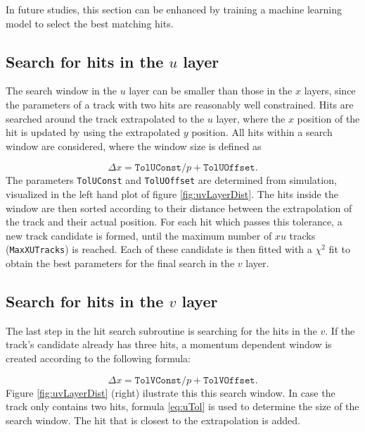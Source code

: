 In future studies, this section can be enhanced by training a machine learning model to select the best matching hits. 

\subsection[Search for hits in the $u$ layer]{Search for hits in the {\boldmath$u$} layer}

The search window in the $u$ layer can be smaller than 
those in the $x$ layers, since the parameters of a track with two hits are reasonably well constrained. 
 Hits are searched around the track extrapolated to the
$u$ layer, where the $x$ position of the hit is updated by using the
extrapolated $y$ position. All hits within a search window are
considered, where the window size is defined as

\begin{equation}
\label{eq:uTol}
\Delta x =  \texttt{TolUConst} / p + \texttt{TolUOffset}.
\end{equation}
The parameters \texttt{TolUConst} and \texttt{TolUOffset} are determined
from simulation, visualized in the left hand plot of figure \ref{fig:uvLayerDist}.
The hits inside the window are then sorted according to their distance between the extrapolation of the track and their actual position. For each hit which passes this tolerance, a new track candidate is formed, until the maximum number of $xu$
tracks (\texttt{MaxXUTracks}) is reached. Each of these candidate is then fitted
with a $\chi^{2}$ fit to obtain the best parameters for the final search in the $v$ layer.


\subsection[Search for hits in the $v$ layer]{Search for hits in the {\boldmath$v$} layer}
The last step in the hit search subroutine is searching for the hits in the $v$.  If the track's candidate already has three hits, a momentum dependent window is created according to the following formula: 

\begin{equation}
\Delta x =  \texttt{TolVConst} / p + \texttt{TolVOffset}.
\end{equation}
Figure \ref{fig:uvLayerDist} (right) ilustrate this this search window. In case the track only contains two hits,
formula \ref{eq:uTol} is used to determine the size of the search window.
The hit that is closest to the extrapolation is added.


